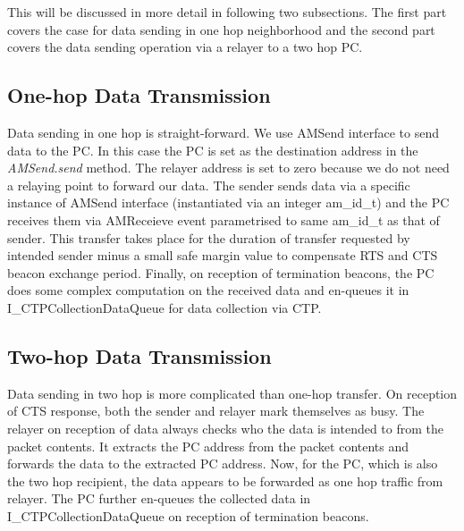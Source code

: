 \par
This will be discussed in more detail in following two subsections. The first part covers the case for data sending in one hop neighborhood and the second part covers the data sending operation via a relayer to a two hop \ac{PC}.

	\subsection{One-hop Data Transmission}
	
    Data sending in one hop is straight-forward. We use AMSend interface to send data to the \ac{PC}. In this case the \ac{PC} is set as the destination address in the \textit{AMSend.send} method. The relayer address is set to zero because we do not need a relaying point to forward our data. The sender sends data via a specific instance of AMSend interface (instantiated via an integer am\_id\_t) and the \ac{PC} receives them via AMReceieve event parametrised to same am\_id\_t as that of sender. This transfer takes place for the duration of transfer requested by intended sender minus a small safe margin value to compensate \ac{RTS} and \ac{CTS} beacon exchange period. Finally, on reception of termination beacons, the \ac{PC} does some complex computation on the received data and en-queues it in I\_CTPCollectionDataQueue for data collection via \ac{CTP}.
	
	\subsection{Two-hop Data Transmission}
    
    Data sending in two hop is more complicated than one-hop transfer. On reception of \ac{CTS} response, both the sender and relayer mark themselves as busy. The relayer on reception of data always checks who the data is intended to from the packet contents. It extracts the \ac{PC} address from the packet contents and forwards the data to the extracted \ac{PC} address. Now, for the \ac{PC}, which is also the two hop recipient, the data appears to be forwarded as one hop traffic from relayer. The \ac{PC} further en-queues the collected data in I\_CTPCollectionDataQueue on reception of termination beacons.
                
